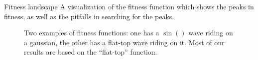 \documentclass[10pt,aspectratio=169]{beamer}
\begin{document}
\begin{frame}{Fitness landscape}
  A visualization of the fitness function which
  shows the peaks in fitness, as well as the pitfalls in searching for
  the peaks.
  \begin{figure}
    \centering
    \caption{Two examples of fitness functions: one has a $\sin()$ wave
      riding on a gaussian, the other has a flat-top wave riding on it.
      Most of our results are based on the ``flat-top'' function.}
    \label{fig:fit-func_pid3095791}
  \end{figure}
\end{frame}
\end{document}
